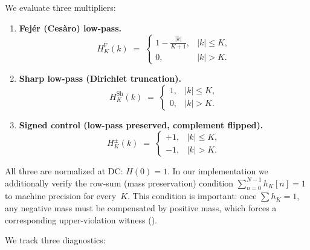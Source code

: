 \documentclass[11pt,a4paper]{article}
\theoremstyle{plain}
\theoremstyle{definition}
\theoremstyle{plain}
\begin{document}
We evaluate three multipliers:
\begin{enumerate}[label=\arabic*.,leftmargin=2em]
  \item \textbf{Fej\'er (Ces\`aro) low-pass.}
    \[
      H^{\mathrm{F}}_K(k) \;=\;
      \begin{cases}
        1 - \frac{|k|}{K+1}, & |k| \le K,\\
        0, & |k| > K.
      \end{cases}
    \]
  \item \textbf{Sharp low-pass (Dirichlet truncation).}
    \[
      H^{\mathrm{Sh}}_K(k) \;=\;
      \begin{cases}
        1, & |k| \le K,\\
        0, & |k| > K.
      \end{cases}
    \]
  \item \textbf{Signed control (low-pass preserved, complement flipped).}
    \[
      H^{\pm}_K(k) \;=\;
      \begin{cases}
        +1, & |k| \le K,\\
        -1, & |k| > K.
      \end{cases}
    \]
\end{enumerate}

All three are normalized at DC: $H(0) = 1$.  In our implementation we
additionally verify the row-sum (mass preservation) condition
$\sum_{n=0}^{N-1} h_K[n] = 1$ to machine precision for every~$K$.  This
condition is important: once $\sum h_K = 1$, any negative mass must be
compensated by positive mass, which forces a corresponding upper-violation
witness ().

We track three diagnostics:
\end{document}
